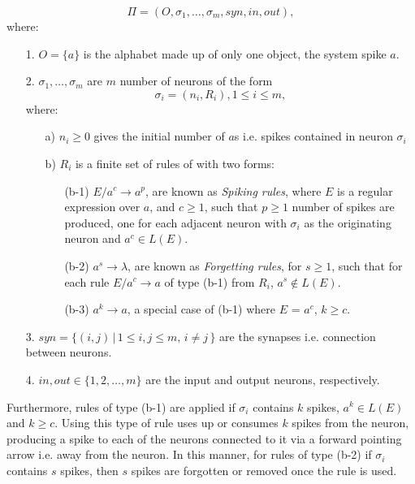 \documentclass{svmultm}
\begin{document}
\begin{definition}\label{snpdefn}
$$\Pi=(O,\sigma_1,\ldots, \sigma_m, syn, in, out),$$
where:
\begin{enumerate}
\item[1.] $O=\{a\}$ is the alphabet made up of only one object, the system spike $a$.

\item[2.] $\sigma_1,\ldots, \sigma_m$ are $m$ number of neurons of the form
$$\sigma_{i}=(n_i, R_i),1\leq i\leq m,$$
where:
\begin{enumerate}
\item[a)] $n_i\geq 0$ gives the initial number of $a$s i.e. spikes contained in neuron $\sigma_i$
\item[b)] $R_i$ is a finite set of rules of with two forms:
\begin{enumerate}
\item[(b-1)]$E/a^c \rightarrow a^p$, are known as \textit{Spiking rules}, where $E$ is a regular expression
over $a$, and $c\geq 1$, such that $p\geq 1$ number of spikes are produced, one for each adjacent neuron with $\sigma_i$ as the originating neuron and $a^c \in L(E)$.
\item[(b-2)]$a^s\rightarrow \lambda$, are known as \textit{Forgetting rules}, for $s\geq 1$, such that for each rule $E/a^c\rightarrow a$ of type (b-1) from $R_i$, $a^s\notin L(E)$. 
\item[(b-3)]$a^k \rightarrow a$, a special case of (b-1) where $E$ = $a^c$, $k \geq c$.
\end{enumerate}
\end{enumerate}
\item[3.] $syn= \{ (i,j)\, |\, 1\leq i,j \leq m, \, i\neq j\, \}$ are the synapses i.e. connection between neurons.

\item[4.] $in, out\in \{1,2,\ldots, m\}$ are the input and output neurons, respectively.
\end{enumerate}

\end{definition}

Furthermore, rules of type (b-1) are applied if $\sigma_i$ contains $k$
spikes, $a^k \in L(E)$ and $k \geq c$. Using this type of rule uses up
or consumes $k$ spikes from the neuron, producing a spike to
each of the neurons connected to it via a forward pointing arrow i.e. away from the neuron. In this manner, for rules of type (b-2)
if $\sigma_i$ contains $s$ spikes, then $s$ spikes are forgotten or
removed once the rule is used. 
\end{document}
